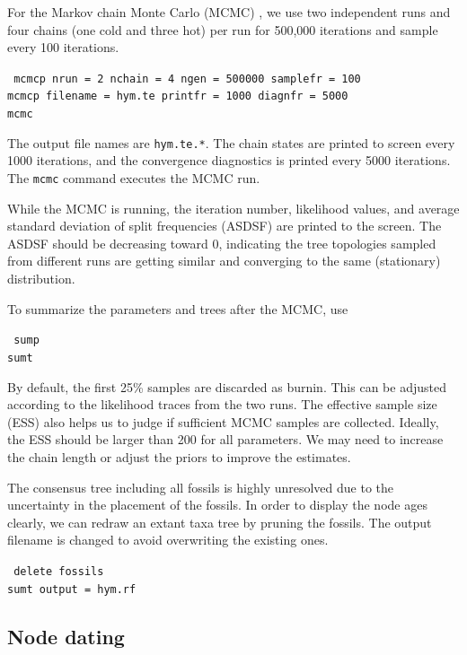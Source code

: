 \documentclass[12pt]{article}
\begin{document}
For the Markov chain Monte Carlo (MCMC) \citep{Metropolis:1953vj, Hastings:1970ew}, we use two independent runs and four chains (one cold and three hot) per run for 500,000 iterations and sample every 100 iterations.
\begin{framed}
{\tt \noindent
mcmcp nrun = 2 nchain = 4 ngen = 500000 samplefr = 100 \\
mcmcp filename = hym.te  printfr = 1000 diagnfr = 5000 \\
mcmc}
\end{framed}
\noindent 
The output file names are {\tt hym.te.*}. The chain states are printed to screen every 1000 iterations, and the convergence diagnostics is printed every 5000 iterations.
The {\tt mcmc} command executes the MCMC run.

While the MCMC is running, the iteration number, likelihood values, and average standard deviation of split frequencies (ASDSF) are printed to the screen.
The ASDSF should be decreasing toward 0, indicating the tree topologies sampled from different runs are getting similar and converging to the same (stationary) distribution.

To summarize the parameters and trees after the MCMC, use
\begin{framed}
{\tt \noindent
sump  \\
sumt}
\end{framed}
\noindent By default, the first 25\% samples are discarded as burnin. 
This can be adjusted according to the likelihood traces from the two runs.
The effective sample size (ESS) also helps us to judge if sufficient MCMC samples are collected.
Ideally, the ESS should be larger than 200 for all parameters.
We may need to increase the chain length or adjust the priors to improve the estimates.

The consensus tree including all fossils is highly unresolved due to the uncertainty in the placement of the fossils.
In order to display the node ages clearly, we can redraw an extant taxa tree by pruning the fossils. The output filename is changed to avoid overwriting the existing ones.
\begin{framed}
{\tt \noindent
delete fossils  \\
sumt output = hym.rf}
\end{framed}

\subsection{Node dating}
\end{document}
